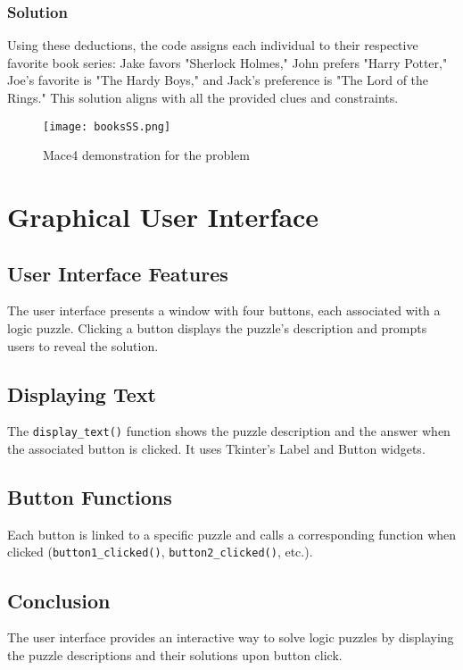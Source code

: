 \documentclass[a4paper,12pt]{report}
\begin{document}
\subsubsection{Solution}

Using these deductions, the code assigns each individual to their respective favorite book series: Jake favors "Sherlock Holmes," John prefers "Harry Potter," Joe's favorite is "The Hardy Boys," and Jack's preference is "The Lord of the Rings." This solution aligns with all the provided clues and constraints.

\begin{figure}[h]
\texttt{[image: booksSS.png]}
\centering
\caption{Mace4 demonstration for the problem}
\end{figure}
\newpage

\section{Graphical User Interface}

\subsection{User Interface Features}
The user interface presents a window with four buttons, each associated with a logic puzzle. Clicking a button displays the puzzle's description and prompts users to reveal the solution.

\subsection{Displaying Text}
The \texttt{display\_text()} function shows the puzzle description and the answer when the associated button is clicked. It uses Tkinter's Label and Button widgets.

\subsection{Button Functions}
Each button is linked to a specific puzzle and calls a corresponding function when clicked (\texttt{button1\_clicked()}, \texttt{button2\_clicked()}, etc.).

\subsection{Conclusion}
The user interface provides an interactive way to solve logic puzzles by displaying the puzzle descriptions and their solutions upon button click.
\end{document}
